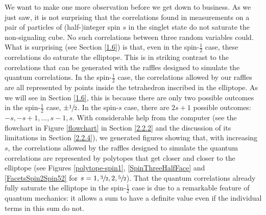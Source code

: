 We want to make one more observation before we get down to business. As we just saw, it is not surprising that the correlations found in measurements on a pair of particles of (half-)integer spin $s$ in the singlet state do not saturate the non-signaling cube. No such correlations between three random variables could. What is surprising (see Section \ref{1.6}) is that, even in the spin-$\frac12$ case, these correlations do saturate the elliptope. This is in striking contrast to the correlations that can be generated with the raffles designed to simulate the quantum correlations. In the spin-$\frac12$ case, the correlations allowed by our raffles are all represented by points inside the tetrahedron inscribed in the elliptope. As we will see in Section \ref{1.6}, this is because there are only two possible outcomes in the spin-$\frac12$ case, $\pm \sfrac12$. In the spin-$s$ case, there are $2s+1$ possible outcomes: $-s, -s+1, \ldots, s-1, s$. With considerable help from the computer (see the flowchart in Figure \ref{flowchart} in Section \ref{2.2.2} and the discussion of its limitations in Section \ref{2.2.4}), we generated figures showing that, with increasing $s$, the correlations allowed by the raffles designed to simulate the quantum correlations are represented by polytopes that get closer and closer to the elliptope (see Figures \ref{polytope-spin1}, \ref{SpinThreeHalfFace} and \ref{FacetsSpin2Spin52} for $s = 1, \sfrac32, 2, \sfrac52$). That the quantum correlations already fully saturate the elliptope in the spin-$\frac12$ case is due to a remarkable feature of quantum mechanics: it allows a sum to have a definite value even if the individual terms in this sum do not.


